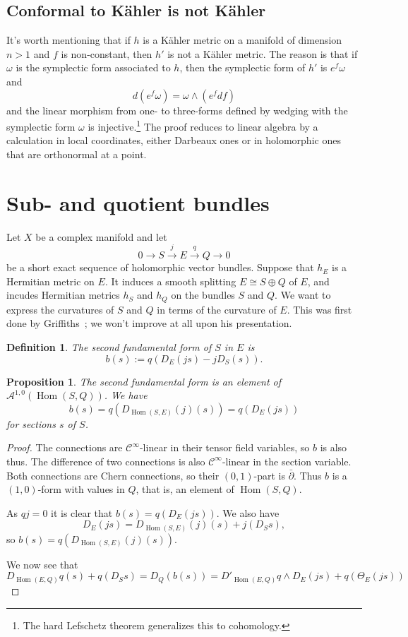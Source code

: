 \documentclass[10pt,a4paper]{article}
\newtheorem{prop}[theo]{Proposition}
\newtheorem{defi}[theo]{Definition}
\newtheorem*{proof}{Proof}
\newcommand{\cc}[1]{\mathcal{#1}}
\DeclareMathOperator{\Hom}{Hom}
\begin{document}
\subsection{Conformal to K\"ahler is not K\"ahler}
\label{sec:org7b1cfdf}

It's worth mentioning that if \(h\) is a K\"ahler metric on a manifold of dimension \(n > 1\) and \(f\) is non-constant, then \(h'\) is not a K\"ahler metric. The reason is that if \(\omega\) is the symplectic form associated to \(h\), then the symplectic form of \(h'\) is \(e^f \omega\) and
$$
d(e^f \omega) = \omega \wedge (e^f df)
$$
and the linear morphism from one- to three-forms defined by wedging with the symplectic form \(\omega\) is injective.\footnote{The hard Lefschetz theorem generalizes this to cohomology.}
The proof reduces to linear algebra by a calculation in local coordinates, either Darbeaux ones or in holomorphic ones that are orthonormal at a point.


\section{Sub- and quotient bundles}
\label{sec:sub-quotient}

Let $X$ be a complex manifold and let
\[
0 \longrightarrow
S \stackrel{j}{\longrightarrow}
E \stackrel{q}{\longrightarrow}
Q \longrightarrow
0
\]
be a short exact sequence of holomorphic vector bundles. Suppose that $h_E$ is a Hermitian metric on $E$. It induces a smooth splitting $E \cong S \oplus Q$ of $E$, and incudes Hermitian metrics $h_S$ and $h_Q$ on the bundles $S$ and $Q$. We want to express the curvatures of $S$ and $Q$ in terms of the curvature of $E$. This was first done by Griffiths~\cite{griffiths1965hermitian}; we won't improve at all upon his presentation.


\begin{defi}
The \emph{second fundamental form} of $S$ in $E$ is
\[
b(s) := q(D_E(js) - jD_S(s)).
\]
\end{defi}

\begin{prop}
\label{prop:second-fundamental-form}
The second fundamental form is an element of $\cc A^{1,0}(\Hom(S,Q))$.
We have
\[
b(s)
= q(D_{\Hom(S,E)}(j)(s))
= q(D_E(js))
\]
for sections $s$ of $S$.
\end{prop}

\begin{proof}
The connections are $\cc C^\infty$-linear in their tensor field variables, so $b$ is also thus. The difference of two connections is also $\cc C^\infty$-linear in the section variable. Both connections are Chern connections, so their $(0,1)$-part is $\bar\partial$. Thus $b$ is a $(1,0)$-form with values in $Q$, that is, an element of $\Hom(S,Q)$.

As $qj = 0$ it is clear that $b(s) = q(D_E(js))$. We also have
\[
D_E(js) = D_{\Hom(S,E)}(j)(s) + j(D_Ss),
\]
so $b(s) = q(D_{\Hom(S,E)}(j)(s))$.

We now see that
\[
D_{\Hom(E,Q)}q(s) + q(D_S s)
= D_{Q}(b(s))
= D'_{\Hom(E,Q)}q \wedge D_E(js)
+ q(\Theta_E(js))
\]
\end{proof}
\end{document}
